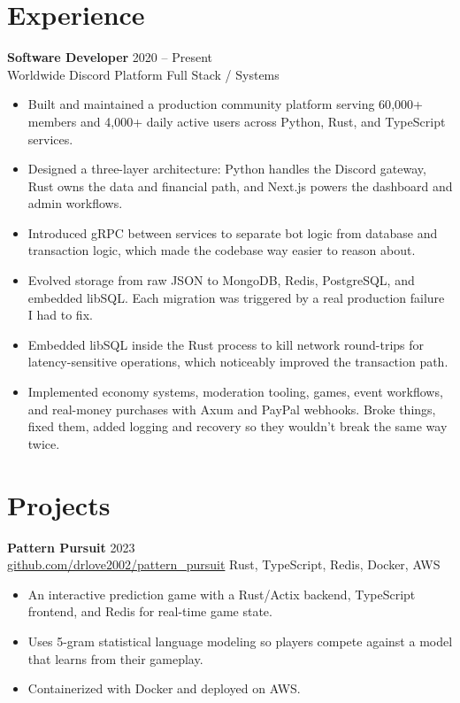 \documentclass[10pt,a4paper]{article}
\newcommand{\resumesubheading}[4]{
  \textbf{#1} \hfill #2 \\
  #3 \hfill #4
}
\begin{document}
\section*{Experience}
\resumesubheading{Software Developer}{2020 -- Present}{Worldwide Discord Platform}{Full Stack / Systems}
\begin{itemize}
  \item Built and maintained a production community platform serving 60{,}000+ members and 4{,}000+ daily active users across Python, Rust, and TypeScript services.
  \item Designed a three-layer architecture: Python handles the Discord gateway, Rust owns the data and financial path, and Next.js powers the dashboard and admin workflows.
  \item Introduced gRPC between services to separate bot logic from database and transaction logic, which made the codebase way easier to reason about.
  \item Evolved storage from raw JSON to MongoDB, Redis, PostgreSQL, and embedded libSQL. Each migration was triggered by a real production failure I had to fix.
  \item Embedded libSQL inside the Rust process to kill network round-trips for latency-sensitive operations, which noticeably improved the transaction path.
  \item Implemented economy systems, moderation tooling, games, event workflows, and real-money purchases with Axum and PayPal webhooks. Broke things, fixed them, added logging and recovery so they wouldn't break the same way twice.
\end{itemize}

\section*{Projects}
\resumesubheading{Pattern Pursuit}{2023}{\href{https://github.com/drlove2002/pattern_pursuit}{github.com/drlove2002/pattern\_pursuit}}{Rust, TypeScript, Redis, Docker, AWS}
\begin{itemize}
  \item An interactive prediction game with a Rust/Actix backend, TypeScript frontend, and Redis for real-time game state.
  \item Uses 5-gram statistical language modeling so players compete against a model that learns from their gameplay.
  \item Containerized with Docker and deployed on AWS.
\end{itemize}
\end{document}
